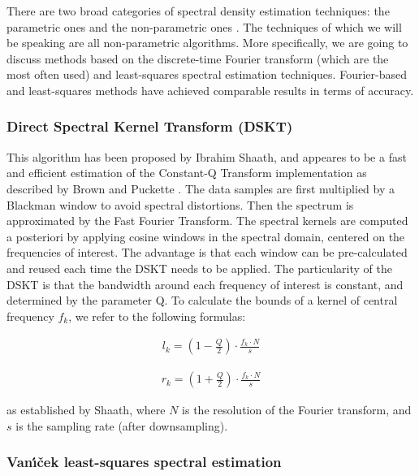 \documentclass[letterpaper]{article}
\begin{document}
There are two broad categories of spectral density estimation techniques: the parametric ones and the non-parametric ones \citep{MHH}. The techniques
of which we will be speaking are all non-parametric algorithms. More specifically, we are going to discuss methods based on the discrete-time Fourier transform (which are the most often used) and least-squares spectral estimation techniques. Fourier-based and least-squares methods have achieved comparable results in terms of accuracy.

\subsubsection{Direct Spectral Kernel Transform (DSKT)}

This algorithm has been proposed by Ibrahim Sha\textquotesingle ath, and appeares to be a fast and efficient estimation of the Constant-Q Transform implementation as described by Brown and Puckette \citep{CQT}.
The data samples are first multiplied by a Blackman window to avoid spectral distortions. Then the spectrum is approximated by the Fast Fourier Transform.
The spectral kernels are computed a posteriori by applying cosine windows in the spectral domain, centered on the frequencies of interest. The advantage is that each window can be pre-calculated and reused each time the DSKT needs to be applied. The particularity of the DSKT is that the bandwidth around each frequency of interest is constant, and determined by the parameter Q. To calculate the bounds of a kernel of central frequency $ f_k $, we refer to the following formulas:

\begin{align}
l_k  = (1 - \frac{Q}{2}) \cdot \frac{f_k \cdot N}{s}
\end{align}

\begin{align}
r_k  = (1 + \frac{Q}{2}) \cdot \frac{f_k \cdot N}{s}
\end{align}

\noindent as established by Sha\textquotesingle ath, where $N$ is the resolution of the Fourier transform, and $s$ is the sampling rate (after downsampling).

\subsubsection{Van\'{\i}\v{c}ek least-squares spectral estimation}
\end{document}
